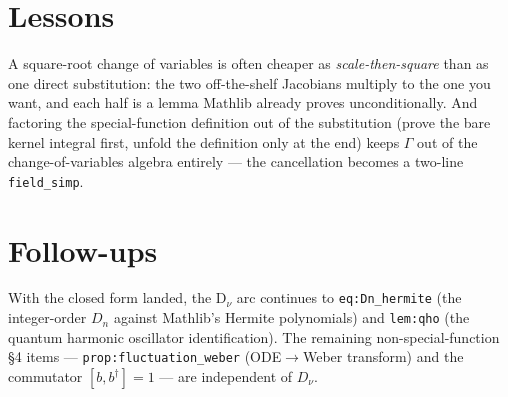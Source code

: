 \documentclass[11pt]{article}
\begin{document}
\section{Lessons}
A square-root change of variables is often cheaper as \emph{scale-then-square} than as one direct
substitution: the two off-the-shelf Jacobians multiply to the one you want, and each half is a lemma
Mathlib already proves unconditionally. And factoring the special-function definition out of the
substitution (prove the bare kernel integral first, unfold the definition only at the end) keeps
$\Gamma$ out of the change-of-variables algebra entirely --- the cancellation becomes a two-line
\texttt{field\_simp}.

\section{Follow-ups}
With the closed form landed, the D$_\nu$ arc continues to \texttt{eq:Dn\_hermite} (the integer-order
$D_n$ against Mathlib's Hermite polynomials) and \texttt{lem:qho} (the quantum harmonic oscillator
identification). The remaining non-special-function \S4 items --- \texttt{prop:fluctuation\_weber}
(ODE$\to$Weber transform) and the commutator $[b,b^\dagger]=1$ --- are independent of $D_\nu$.
\end{document}
